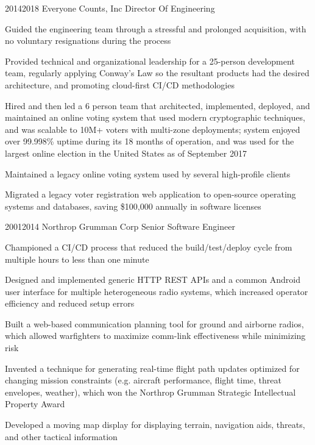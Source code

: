 \job
  {2014}{2018}
  {Everyone Counts, Inc}
  {Director Of Engineering}
  {\begin{achievements}
    \item Guided the engineering team through a stressful and prolonged acquisition, with no voluntary resignations during the process
    \item Provided technical and organizational leadership for a 25-person development team, regularly applying Conway's Law so the resultant products had the desired architecture, and promoting cloud-first CI/CD methodologies
    \item Hired and then led a 6 person team that architected, implemented, deployed, and maintained an online voting system that used modern cryptographic techniques, and was scalable to 10M+ voters with multi-zone deployments; system enjoyed over 99.998\% uptime during its 18 months of operation, and was used for the largest online election in the United States as of September 2017
    \item Maintained a legacy online voting system used by several high-profile clients
    \item Migrated a legacy voter registration web application to open-source operating systems and databases, saving \$100,000 annually in software licenses
  \end{achievements}}

\job
  {2001}{2014}
  {Northrop Grumman Corp}
  {Senior Software Engineer}
  {\begin{achievements}
    \item Championed a CI/CD process that reduced the build/test/deploy cycle from multiple hours to less than one minute
    \item Designed and implemented generic HTTP REST APIs and a common Android user interface for multiple heterogeneous radio systems, which increased operator efficiency and reduced setup errors
    \item Built a web-based communication planning tool for ground and airborne radios, which allowed warfighters to maximize comm-link effectiveness while minimizing risk
    \item Invented a technique for generating real-time flight path updates optimized for changing mission constraints (e.g. aircraft performance, flight time, threat envelopes, weather), which won the Northrop Grumman Strategic Intellectual Property Award
    \item Developed a moving map display for displaying terrain, navigation aids, threats, and other tactical information
  \end{achievements}}

